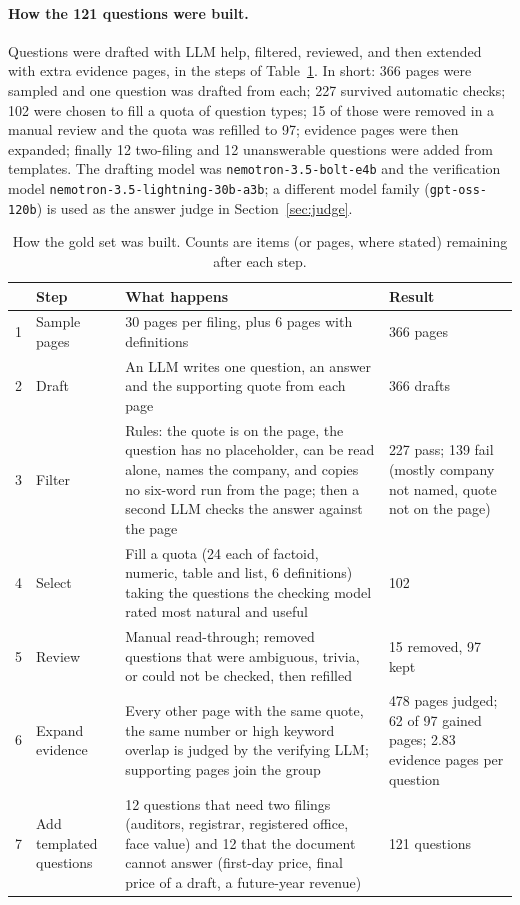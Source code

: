\documentclass[11pt,a4paper]{article}
\begin{document}
\paragraph{How the 121 questions were built.} Questions were drafted with LLM help, filtered, reviewed, and then extended with extra evidence pages, in the steps of Table~\ref{tab:funnel}. In short: 366 pages were sampled and one question was drafted from each; 227 survived automatic checks; 102 were chosen to fill a quota of question types; 15 of those were removed in a manual review and the quota was refilled to 97; evidence pages were then expanded; finally 12 two-filing and 12 unanswerable questions were added from templates. The drafting model was \texttt{nemotron-3.5-bolt-e4b} and the verification model \texttt{nemotron-3.5-lightning-30b-a3b}; a different model family (\texttt{gpt-oss-120b}) is used as the answer judge in Section~\ref{sec:judge}.

\begin{table}[t]
\centering
\caption{How the gold set was built. Counts are items (or pages, where stated) remaining after each step.}
\label{tab:funnel}
\footnotesize
\begin{tabular}{@{}p{0.3cm}p{2.6cm}p{8.4cm}p{3.1cm}@{}}
\toprule
 & Step & What happens & Result \\
\midrule
1 & Sample pages & 30 pages per filing, plus 6 pages with definitions & 366 pages \\
2 & Draft & An LLM writes one question, an answer and the supporting quote from each page & 366 drafts \\
3 & Filter & Rules: the quote is on the page, the question has no placeholder, can be read alone, names the company, and copies no six-word run from the page; then a second LLM checks the answer against the page & 227 pass; 139 fail (mostly company not named, quote not on the page) \\
4 & Select & Fill a quota (24 each of factoid, numeric, table and list, 6 definitions) taking the questions the checking model rated most natural and useful & 102 \\
5 & Review & Manual read-through; removed questions that were ambiguous, trivia, or could not be checked, then refilled & 15 removed, 97 kept \\
6 & Expand evidence & Every other page with the same quote, the same number or high keyword overlap is judged by the verifying LLM; supporting pages join the group & 478 pages judged; 62 of 97 gained pages; 2.83 evidence pages per question \\
7 & Add templated questions & 12 questions that need two filings (auditors, registrar, registered office, face value) and 12 that the document cannot answer (first-day price, final price of a draft, a future-year revenue) & 121 questions \\
\bottomrule
\end{tabular}
\end{table}
\end{document}
